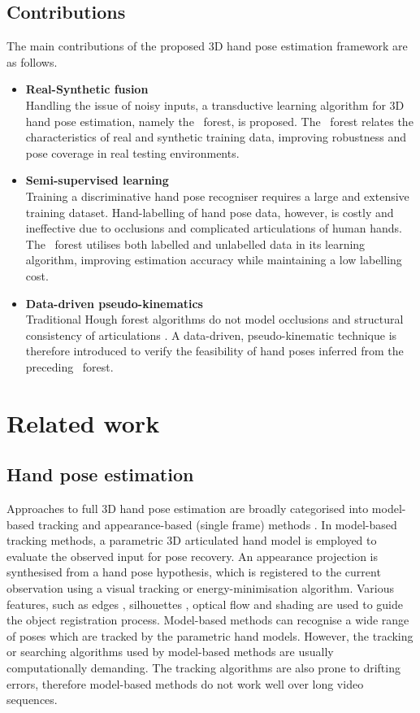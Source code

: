 \subsection{Contributions} 
The main contributions of the proposed 3D hand pose estimation framework are as follows. 

\begin{itemize}
\item{\textbf{Real-Synthetic fusion}}\\
Handling the issue of noisy inputs, a transductive learning algorithm for 3D hand pose estimation, namely the \STR\ forest, is proposed. The \STR\ forest relates the characteristics of real and synthetic training data, improving robustness and pose coverage in real testing environments.
\item{\textbf{Semi-supervised learning}}\\
Training a discriminative hand pose recogniser requires a large and extensive training dataset. Hand-labelling of hand pose data, however, is costly and ineffective due to occlusions and complicated articulations of human hands. 
The \STR\ forest utilises both labelled and unlabelled data in its learning algorithm, improving estimation accuracy while maintaining a low labelling cost. 
\item{\textbf{Data-driven pseudo-kinematics}}\\
	Traditional Hough forest algorithms do not model occlusions and structural consistency of articulations \cite{Gall2009}. A data-driven, pseudo-kinematic technique is therefore introduced to verify the feasibility of hand poses inferred from the preceding \STR\ forest.  
\end{itemize} 

\section{Related work}

\subsection{Hand pose estimation}

Approaches to full 3D hand pose estimation are broadly categorised into model-based tracking and appearance-based (single frame) methods \cite{Erol2007}. In model-based tracking methods, a parametric 3D articulated hand model is employed to evaluate the observed input for pose recovery. An appearance projection is synthesised from a hand pose hypothesis, which is registered to the current observation using a visual tracking or energy-minimisation algorithm. Various features, such as edges \cite{Guan2006}, silhouettes \cite{Wu2000}, optical flow \cite{Lu2003} and shading \cite{LaGorce2011} are used to guide the object registration process. 
Model-based methods can recognise a wide range of poses which are tracked by the parametric hand models.
However, the tracking or searching algorithms used by model-based methods are usually computationally demanding. The tracking algorithms are also prone to drifting errors, therefore model-based methods do not work well over long video sequences. 

